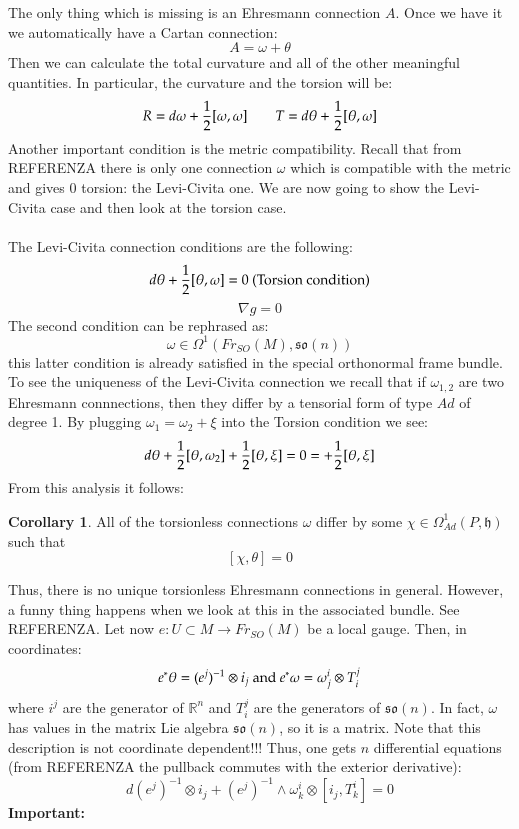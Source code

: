 \documentclass[12pt,a4paper]{report}
\theoremstyle{definition}
\theoremstyle{Theorem}
\theoremstyle{break}
\theoremstyle{definition}
\newtheorem{Cor}[Def]{Corollary}
\begin{document}
		The only thing which is missing is an Ehresmann connection $A$. Once we have it we automatically have a Cartan connection:
		$$A=\omega+\theta$$
		Then we can calculate the total curvature and all of the other meaningful quantities. In particular, the curvature and the torsion will be:
		$$R=d\omega+{1\over 2}[\omega,\omega]\hspace{ 20 pt} T=d\theta+{1\over 2}[\theta,\omega]$$
		Another important condition is the metric compatibility. Recall that from REFERENZA there is only one connection $\omega$ which is compatible with the metric and gives $0$ torsion: the Levi-Civita one. We are now going to show the Levi-Civita case and then look at the torsion case.\\
		\\
		The Levi-Civita connection conditions are the following:
		$$d\theta+{1\over 2}[\theta,\omega]=0 \hbox{ (Torsion condition)}$$
		$$\nabla g=0$$
		The second condition can be rephrased as:
		$$\omega\in\Omega^1(Fr_{SO}(M),\mathfrak{so}(n))$$
		this latter condition is already satisfied in the special orthonormal frame bundle.\\
		To see the uniqueness of the Levi-Civita connection we recall that if $\omega_{1,2}$ are two Ehresmann connnections, then they differ by a tensorial form of type $Ad$ of degree 1. By plugging $\omega_1=\omega_2+\xi$ into the Torsion condition we see:
		$$d\theta+{1\over 2}[\theta,\omega_2]+{1\over 2}[\theta,\xi]=0=+{1\over 2}[\theta,\xi]$$
		From this analysis it follows:
		\begin{Cor}
			All of the torsionless connections $\omega$ differ by some $\chi\in\Omega^1_{Ad}(P,\mathfrak{h})$ such that
			$$[\chi,\theta]=0$$
		\end{Cor}
		Thus, there is no unique torsionless Ehresmann connections in general. However, a funny thing happens when we look at this in the associated bundle. See REFERENZA.
		Let now $e:U\subset M\rightarrow Fr_{SO}(M)$ be a local gauge. Then, in coordinates:
		$$e^*\theta=(e^j)^{-1}\otimes i_j\hbox{ and }e^*\omega=\omega^i_j\otimes T^j_i$$
		where $i^j$ are the generator of $\mathbb{R}^n$ and $T^j_i$ are the generators of $\mathfrak{so}(n)$.
		In fact, $\omega$ has values in the matrix Lie algebra $\mathfrak{so}(n)$, so it is a matrix. Note that this description is not coordinate dependent!!! Thus, one gets $n$ differential equations (from REFERENZA the pullback commutes with the exterior derivative):
		$$d(e^j)^{-1}\otimes i_j+(e^j)^{-1}\wedge \omega^i_k \otimes [i_j,T^i_k]=0$$
		\textbf{Important:}
		\\
\end{document}
